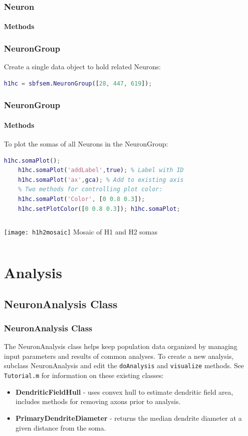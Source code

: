 \documentclass[11pt]{beamer}
\begin{document}
\begin{frame}[fragile]
	\frametitle{Neuron}
	\framesubtitle{Methods}
\end{frame}
\begin{frame}[fragile]
	\frametitle{NeuronGroup}
	Create a single data object to hold related Neurons:
	\begin{lstlisting}[language=matlab]
	h1hc = sbfsem.NeuronGroup([28, 447, 619]);
	\end{lstlisting}
\end{frame}
\begin{frame}[fragile]
	\frametitle{NeuronGroup}
	\framesubtitle{Methods}
	To plot the somas of all Neurons in the NeuronGroup:
	\begin{lstlisting}[language=matlab]
	h1hc.somaPlot();
	h1hc.somaPlot('addLabel',true); % Label with ID
	h1hc.somaPlot('ax',gca); % Add to existing axis
	% Two methods for controlling plot color:
	h1hc.somaPlot('Color', [0 0.8 0.3]);
	h1hc.setPlotColor([0 0.8 0.3]); h1hc.somaPlot;\end{lstlisting}
	\begin{columns}
			\texttt{[image: h1h2mosaic]}
			Mosaic of H1 and H2 somas
	\end{columns}
\end{frame}
\section{Analysis}
\subsection{NeuronAnalysis Class}
\begin{frame}
	\frametitle{NeuronAnalysis Class}
	The NeuronAnalysis class helps keep population data organized by managing input parameters and results of common analyses. To create a new analysis, subclass NeuronAnalysis and edit the \texttt{doAnalysis} and \texttt{visualize} methods.
	\vskip10pt
	See \texttt{Tutorial.m} for information on these existing classes:
	\begin{itemize}
		\item \textbf{DendriticFieldHull} - uses convex hull to estimate dendritic field area, includes methods for removing axons prior to analysis.
		\item \textbf{PrimaryDendriteDiameter} - returns the median dendrite diameter at a given distance from the soma.
	\end{itemize}
\end{frame}
\end{document}
